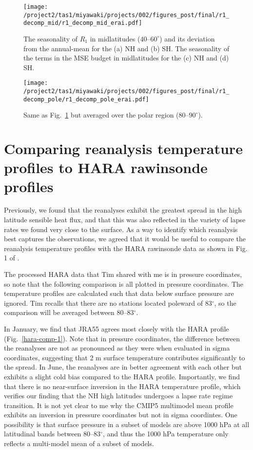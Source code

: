 \documentclass{article}
\begin{document}
\begin{figure}[t]
  \noindent\texttt{[image: /project2/tas1/miyawaki/projects/002/figures\_post/final/r1\_decomp\_mid/r1\_decomp\_mid\_erai.pdf]}\\
  \caption{The seasonality of $R_{1}$ in midlatitudes ($40$--$60^{\circ}$) and its deviation from the annual-mean for the (a) NH and (b) SH. The seasonality of the terms in the MSE budget in midlatitudes for the (c) NH and (d) SH.}
  \label{fig:erai-r1-decomp-mid}
\end{figure}

\begin{figure}[t]
  \noindent\texttt{[image: /project2/tas1/miyawaki/projects/002/figures\_post/final/r1\_decomp\_pole/r1\_decomp\_pole\_erai.pdf]}\\
  \caption{Same as Fig.~\ref{fig:erai-r1-decomp-mid} but averaged over the polar region ($80$--$90^{\circ}$).}
  \label{fig:erai-r1-decomp-pole}
\end{figure}

\section{Comparing reanalysis temperature profiles to HARA rawinsonde profiles}

Previously, we found that the reanalyses exhibit the greatest spread in the high latitude sensible heat flux, and that this was also reflected in the variety of lapse rates we found very close to the surface. As a way to identify which reanalysis best captures the observations, we agreed that it would be useful to compare the reanalysis temperature profiles with the HARA rawinsonde data as shown in Fig. 1 of \cite{cronin2016}.

The processed HARA data that Tim shared with me is in pressure coordinates, so note that the following comparison is all plotted in pressure coordinates. The temperature profiles are calculated such that data below surface pressure are ignored. Tim recalls that there are no stations located poleward of 83$^\circ$, so the comparison will be averaged between 80--83$^\circ$.

In January, we find that JRA55 agrees most closely with the HARA profile (Fig.~\ref{hara-comp-1}). Note that in pressure coordinates, the difference between the reanalyses are not as pronounced as they were when evaluated in sigma coordinates, suggesting that 2 m surface temperature contributes significantly to the spread. In June, the reanalyses are in better agreement with each other but exhibits a slight cold bias compared to the HARA profile. Importantly, we find that there is no near-surface inversion in the HARA temperature profile, which verifies our finding that the NH high latitudes undergoes a lapse rate regime transition. It is not yet clear to me why the CMIP5 multimodel mean profile exhibits an inversion in pressure coordinates but not in sigma coordintes. One possibility is that surface pressure in a subset of models are above 1000 hPa at all latitudinal bands between 80--83$^\circ$, and thus the 1000 hPa temperature only reflects a multi-model mean of a subset of models.
\end{document}
